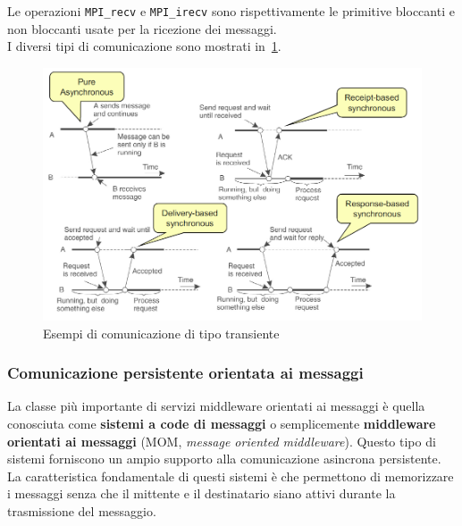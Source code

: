 Le operazioni \texttt{MPI\_recv} e \texttt{MPI\_irecv} sono rispettivamente le primitive bloccanti e non bloccanti usate per la ricezione dei messaggi.\\
I diversi tipi di comunicazione sono mostrati in \figurename\,\ref{img:tranmpi}.
\begin{figure}
\centering
\includegraphics[scale=0.5]{img/tranmpi.png}
\caption{Esempi di comunicazione di tipo transiente}\label{img:tranmpi}
\end{figure}
\subsubsection{Comunicazione persistente orientata ai messaggi}
La classe più importante di servizi middleware orientati ai messaggi è quella conosciuta come \textbf{sistemi a code di messaggi} o semplicemente \textbf{middleware orientati ai messaggi} (MOM, \emph{message oriented middleware}). Questo tipo di sistemi forniscono un ampio supporto alla comunicazione asincrona persistente. La caratteristica fondamentale di questi sistemi è che permettono di memorizzare i messaggi senza che il mittente e il destinatario siano attivi durante la trasmissione del messaggio. 

